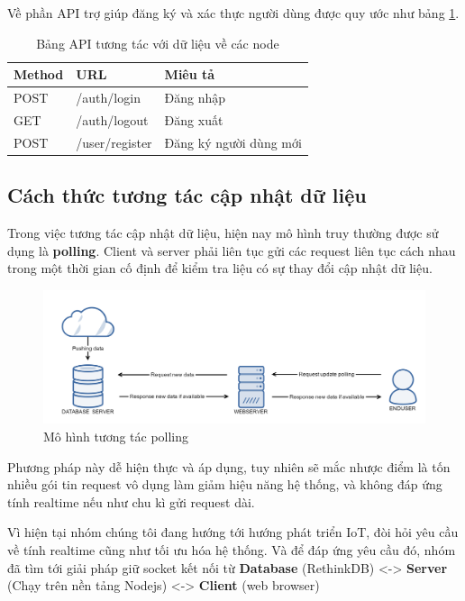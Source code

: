 Về phần API trợ giúp đăng ký và xác thực người dùng được quy ước như bảng \ref{table: apiuser}.
\begin{table}[H]
	\centering
	\caption{Bảng API tương tác với dữ liệu về các node}
	\begin{tabular}{|l|l|l|}
		\hline
		Method & URL            & Miêu tả                \\ \hline
		POST   & /auth/login       & Đăng nhập                           \\ \hline
		GET   & /auth/logout   & Đăng xuất   \\ \hline
		POST   & /user/register     & Đăng ký người dùng mới \\ \hline
	\end{tabular}
	\label{table: apiuser}
\end{table}
\subsection{Cách thức tương tác cập nhật dữ liệu}

Trong việc tương tác cập nhật dữ liệu, hiện nay mô hình truy thường được sử dụng là \textbf{polling}. Client và server phải liên tục gửi các request liên tục cách nhau trong một thời gian cố định để kiểm tra liệu có sự thay đổi cập nhật dữ liệu. 
\begin{figure}[H]
	\centering    
	\includegraphics[width=1.0\textwidth]{polling}
	\caption[Mô hình tương tác polling]{Mô hình tương tác polling}
	\label{fig: polling}
\end{figure}
Phương pháp này dễ hiện thực và áp dụng, tuy nhiên sẽ mắc nhược điểm là tốn nhiều gói tin request vô dụng làm giảm hiệu năng hệ thống, và không đáp ứng tính realtime nếu như chu kì gửi request dài.



Vì hiện tại nhóm chúng tôi đang hướng tới hướng phát triển IoT, đòi hỏi yêu cầu về tính realtime cũng như tối ưu hóa hệ thống. Và để đáp ứng yêu cầu đó, nhóm đã tìm tới giải pháp giữ socket kết nối từ \textbf{Database} (RethinkDB) <-> \textbf{Server} (Chạy trên nền tảng Nodejs) <-> \textbf{Client} (web browser)

